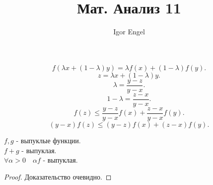 \documentclass[11pt, oneside]{article}   	%
\title{Мат. Анализ 11}
\author{Igor Engel}
\date{}
\begin{document}
\maketitle
\section{}
\[ f(\lambda x + (1-\lambda) y) = \lambda f(x) + (1-\lambda)f(y) .\]
\[ z = \lambda x + (1-\lambda)y .\]
\[ \lambda = \frac{y-z}{y-x} .\]
\[ 1-\lambda = \frac{z-x}{y-x} .\]
\[ f(z) \le \frac{y-z}{y-x}f(x) + \frac{z-x}{y-x}f(y) .\]
\[ (y-x)f(z) \le (y-z)f(x) + (z-x)f(y) .\]
\begin{theorem}
    $f, g$ -   выпуклые функции.\\
    $f+g$ -  выпуклая.\\
    $\forall{\alpha > 0}\quad \alpha f$ - выпуклая.
    \begin{proof}
        Доказательство очевидно.
    \end{proof}
\end{theorem}
\end{document}
